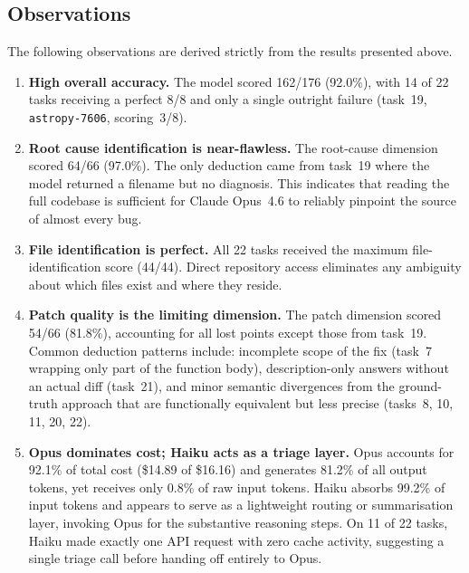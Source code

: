 \subsection{Observations}\label{sec:raw-obs}

The following observations are derived strictly from the results
presented above.

\begin{enumerate}

\item \textbf{High overall accuracy.}
      The model scored 162/176 (92.0\%), with 14 of 22 tasks receiving
      a perfect 8/8 and only a single outright failure (task~19,
      \texttt{astropy-7606}, scoring~3/8).

\item \textbf{Root cause identification is near-flawless.}
      The root-cause dimension scored 64/66 (97.0\%).  The only
      deduction came from task~19 where the model returned a filename
      but no diagnosis.  This indicates that reading the full codebase
      is sufficient for Claude Opus~4.6 to reliably pinpoint the
      source of almost every bug.

\item \textbf{File identification is perfect.}
      All 22 tasks received the maximum file-identification score
      (44/44).  Direct repository access eliminates any ambiguity about
      which files exist and where they reside.

\item \textbf{Patch quality is the limiting dimension.}
      The patch dimension scored 54/66 (81.8\%), accounting for all
      lost points except those from task~19.  Common deduction patterns
      include: incomplete scope of the fix (task~7 wrapping only part
      of the function body), description-only answers without an actual
      diff (task~21), and minor semantic divergences from the
      ground-truth approach that are functionally equivalent but less
      precise (tasks~8, 10, 11, 20, 22).

\item \textbf{Opus dominates cost; Haiku acts as a triage layer.}
      Opus accounts for 92.1\% of total cost (\$14.89 of \$16.16) and
      generates 81.2\% of all output tokens, yet receives only 0.8\%
      of raw input tokens.  Haiku absorbs 99.2\% of input tokens and
      appears to serve as a lightweight routing or summarisation layer,
      invoking Opus for the substantive reasoning steps.  On 11 of 22
      tasks, Haiku made exactly one API request with zero cache
      activity, suggesting a single triage call before handing off
      entirely to Opus.


\end{enumerate}
